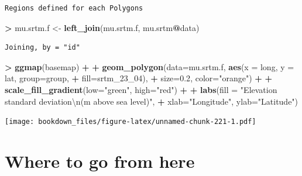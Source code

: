 \documentclass[]{krantz}
\makeatletter
\newenvironment{Shaded}{\begin{snugshade}}{\end{snugshade}}
\newcommand{\KeywordTok}[1]{\textcolor[rgb]{0.27,0.27,0.27}{\textbf{#1}}}
\newcommand{\DataTypeTok}[1]{\textcolor[rgb]{0.27,0.27,0.27}{#1}}
\newcommand{\DecValTok}[1]{\textcolor[rgb]{0.06,0.06,0.06}{#1}}
\newcommand{\FloatTok}[1]{\textcolor[rgb]{0.06,0.06,0.06}{#1}}
\newcommand{\CharTok}[1]{\textcolor[rgb]{0.5,0.5,0.5}{#1}}
\newcommand{\StringTok}[1]{\textcolor[rgb]{0.5,0.5,0.5}{#1}}
\newcommand{\OperatorTok}[1]{\textcolor[rgb]{0.43,0.43,0.43}{\textbf{#1}}}
\newcommand{\NormalTok}[1]{#1}
\newenvironment{kframe}{%
\medskip{}
\setlength{\fboxsep}{.8em}
 \def\at@end@of@kframe{}%
 \ifinner\ifhmode%
  \def\at@end@of@kframe{\end{minipage}}%
  \begin{minipage}{\columnwidth}%
 \fi\fi%
 \def\FrameCommand##1{\hskip\@totalleftmargin \hskip-\fboxsep
 \colorbox{shadecolor}{##1}\hskip-\fboxsep
     \hskip-\linewidth \hskip-\@totalleftmargin \hskip\columnwidth}%
 \MakeFramed {\advance\hsize-\width
   \@totalleftmargin\z@ \linewidth\hsize
   \@setminipage}}%
 {\par\unskip\endMakeFramed%
 \at@end@of@kframe}
\renewenvironment{Shaded}{\begin{kframe}}{\end{kframe}}
\makeatother
\begin{document}
\begin{verbatim}
Regions defined for each Polygons
\end{verbatim}

\begin{Shaded}
\begin{Highlighting}[]
\OperatorTok{>}\StringTok{ }\NormalTok{mu.srtm.f <-}\StringTok{ }\KeywordTok{left_join}\NormalTok{(mu.srtm.f, mu.srtm}\OperatorTok{@}\NormalTok{data)}
\end{Highlighting}
\end{Shaded}

\begin{verbatim}
Joining, by = "id"
\end{verbatim}

\begin{Shaded}
\begin{Highlighting}[]
\OperatorTok{>}\StringTok{ }\KeywordTok{ggmap}\NormalTok{(basemap) }\OperatorTok{+}
\OperatorTok{+}\StringTok{     }\KeywordTok{geom_polygon}\NormalTok{(}\DataTypeTok{data=}\NormalTok{mu.srtm.f, }\KeywordTok{aes}\NormalTok{(}\DataTypeTok{x =}\NormalTok{ long, }\DataTypeTok{y =}\NormalTok{ lat, }\DataTypeTok{group=}\NormalTok{group, }
\OperatorTok{+}\StringTok{                                      }\DataTypeTok{fill=}\NormalTok{srtm_23_}\DecValTok{04}\NormalTok{), }
\OperatorTok{+}\StringTok{                  }\DataTypeTok{size=}\FloatTok{0.2}\NormalTok{, }\DataTypeTok{color=}\StringTok{"orange"}\NormalTok{) }\OperatorTok{+}
\OperatorTok{+}\StringTok{     }\KeywordTok{scale_fill_gradient}\NormalTok{(}\DataTypeTok{low=}\StringTok{"green"}\NormalTok{, }\DataTypeTok{high=}\StringTok{"red"}\NormalTok{) }\OperatorTok{+}
\OperatorTok{+}\StringTok{         }\KeywordTok{labs}\NormalTok{(}\DataTypeTok{fill =} \StringTok{"Elevation standard deviation}\CharTok{\textbackslash{}n}\StringTok{(m above sea level)"}\NormalTok{, }
\OperatorTok{+}\StringTok{          }\DataTypeTok{xlab=}\StringTok{"Longitude"}\NormalTok{, }\DataTypeTok{ylab=}\StringTok{"Latitude"}\NormalTok{)}
\end{Highlighting}
\end{Shaded}

\texttt{[image: bookdown\_files/figure-latex/unnamed-chunk-221-1.pdf]}

\section{Where to go from here}\label{where-to-go-from-here}
\end{document}
